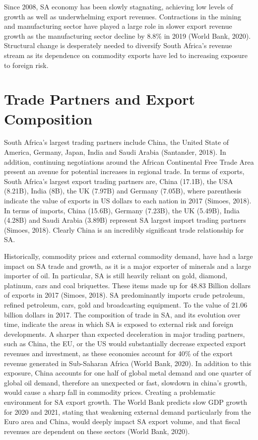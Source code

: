 \documentclass[11pt,preprint, authoryear]{elsarticle}
\numberwithin{equation}{section}
\numberwithin{figure}{section}
\numberwithin{table}{section}
\begin{document}
Since 2008, SA economy has been slowly stagnating, achieving low levels
of growth as well as underwhelming export revenues. Contractions in the
mining and manufacturing sector have played a large role in slower
export revenue growth as the manufacturing sector decline by 8.8\% in
2019 (World Bank, 2020). Structural change is desperately needed to
diversify South Africa's revenue stream as its dependence on commodity
exports have led to increasing exposure to foreign risk.

\hypertarget{trade-partners-and-export-composition}{%
\section{\texorpdfstring{Trade Partners and Export Composition
\label{Trade Partners and Export Composition}}{Trade Partners and Export Composition }}\label{trade-partners-and-export-composition}}

South Africa's largest trading partners include China, the United State
of America, Germany, Japan, India and Saudi Arabia (Santander, 2018). In
addition, continuing negotiations around the African Continental Free
Trade Area present an avenue for potential increases in regional trade.
In terms of exports, South Africa's largest export trading partners are,
China (17.1B), the USA (8.21B), India (8B), the UK (7.97B) and Germany
(7.05B), where parenthesis indicate the value of exports in US dollars
to each nation in 2017 (Simoes, 2018). In terms of imports, China
(15.6B), Germany (7.23B), the UK (5.49B), India (4.28B) and Saudi Arabia
(3.89B) represent SA largest import trading partners (Simoes, 2018).
Clearly China is an incredibly significant trade relationship for SA.

Historically, commodity prices and external commodity demand, have had a
large impact on SA trade and growth, as it is a major exporter of
minerals and a large importer of oil. In particular, SA is still heavily
reliant on gold, diamond, platinum, cars and coal briquettes. These
items made up for 48.83 Billion dollars of exports in 2017 (Simoes,
2018). SA predominantly imports crude petroleum, refined petroleum,
cars, gold and broadcasting equipment. To the value of 21.06 billion
dollars in 2017. The composition of trade in SA, and its evolution over
time, indicate the areas in which SA is exposed to external risk and
foreign developments. A sharper than expected deceleration in major
trading partners, such as China, the EU, or the US would substantially
decrease expected export revenues and investment, as these economies
account for 40\% of the export revenue generated in Sub-Saharan Africa
(World Bank, 2020). In addition to this exposure, China accounts for one
half of global metal demand and one quarter of global oil demand,
therefore an unexpected or fast, slowdown in china's growth, would cause
a sharp fall in commodity prices. Creating a problematic environment for
SA export growth. The World Bank predicts slow GDP growth for 2020 and
2021, stating that weakening external demand particularly from the Euro
area and China, would deeply impact SA export volume, and that fiscal
revenues are dependent on these sectors (World Bank, 2020).
\end{document}
